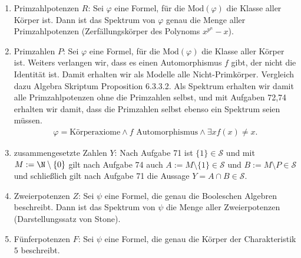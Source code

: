 \begin{solution}
\phantom{}

	\begin{enumerate}[label = \arabic*.]
		\item Primzahlpotenzen $R$: Sei $\varphi$ eine Formel, für die $\mathrm{Mod}(\varphi)$ die Klasse aller Körper ist.
		Dann ist das Spektrum von $\varphi$ genau die Menge aller Primzahlpotenzen (Zerfällungskörper des Polynoms $x^{p^n}- x$).
		\item Primzahlen $P$: Sei $\varphi$ eine Formel, für die $\mathrm{Mod}(\varphi)$ die Klasse aller Körper ist. Weiters verlangen wir, dass es einen Automorphismus $f$ gibt, der nicht
		die Identität ist. Damit erhalten wir als Modelle alle Nicht-Primkörper. Vergleich dazu Algebra Skriptum Proposition 6.3.3.2. Als Spektrum erhalten wir damit alle Primzahlpotenzen
		ohne die Primzahlen selbst, und mit Aufgaben 72,74 erhalten wir damit, dass
		die Primzahlen selbst ebenso ein Spektrum seien müssen.
		\begin{align*}
			\varphi = \text{Körperaxiome} \land f \text{ Automorphismus} \land \exists x f(x) \neq x.
		\end{align*}

		\item zusammengesetzte Zahlen $Y$: Nach Aufgabe 71 ist $\{1\} \in \mathscr{S}$ und mit $M := \N \setminus \{0\}$ gilt  nach Aufgabe 74 auch $A:= M \setminus \{1\} \in \mathscr{S}$ und $B := M \setminus P \in \mathscr{S}$ und schließlich gilt nach Aufgabe 71 die Aussage $Y = A \cap B \in \mathscr{S}$.


		\item Zweierpotenzen $Z$: Sei $\psi$ eine Formel, die genau die Booleschen Algebren beschreibt. Dann ist das Spektrum von $\psi$ die Menge aller Zweierpotenzen (Darstellungssatz von Stone).

		\item Fünferpotenzen $F$: Sei $\psi$ eine Formel, die genau die Körper der
		Charakteristik $5$ beschreibt.


\end{enumerate}
\end{solution}
